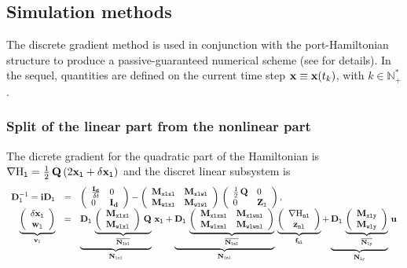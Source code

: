 \documentclass[10pt,a4paper]{article}
\begin{document}
\subsection{Simulation methods}
%
The discrete gradient method is used in conjunction with the port-Hamiltonian structure to produce a passive-guaranteed numerical scheme (see \cite{falaize2016apassive} for details).
%
In the sequel, quantities are defined on the current time step ${\mathbf{x}}\equiv{\mathbf{x}}(t_k)$, with $k\in\mathbb{N}_{+}^{*}$.
%
\subsubsection{Split of the linear part from the nonlinear part}
%
The dicrete gradient for the quadratic part of the Hamiltonian is ${\small \nabla{\mathrm{H}}_{\mathtt{l}} =\frac{1}{2}\,\mathbf{Q}\, (2{\mathbf{x}}_{\mathtt{l}} + \delta {\mathbf{x}}_{\mathtt{l}})}$ and the discret linear subsystem is
%
\begin{equation}
\begin{array}{rcl}
\mathbf{D}_{\mathtt{l}}^{-1} = \mathbf{iD}_{\mathtt{l}} &=& \left(\begin{array}{ll}
\frac{\mathbf{I_d}}{\delta t}&0 \\ 
0 &\mathbf{I_d}
\end{array}\right)-\left(\begin{array}{ll}
\mathbf{M}_{\mathtt{xlxl}}&\mathbf{M}_{\mathtt{xlwl}} \\ 
\mathbf{M}_{\mathtt{wlxl}}&\mathbf{M}_{\mathtt{wlwl}} 
\end{array}\right)\,\left(\begin{array}{ll}
\frac{1}{2}\,\mathbf{Q}&0 \\ 
0 &\mathbf{Z}_{\mathtt{l}}
\end{array}\right),\\
\underbrace{\left(\begin{array}{c}
\delta {\mathbf{x}}_{\mathtt{l}}\\
{\mathbf{w}}_{\mathtt{l}}
\end{array}\right) 
}_{\mathbf{v}_{\mathtt{l}}}
& = &
\underbrace{\mathbf{D}_{\mathtt{l}}\,
\underbrace{\left(\begin{array}{ll}
\mathbf{M}_{\mathtt{xlxl}}\\ 
\mathbf{M}_{\mathtt{wlxl}}
\end{array}\right)\,\mathbf{Q}}_{\overline{\mathbf{N}_{\mathtt{lxl}}}}}_{\mathbf{N}_{\mathtt{lxl}}}
\, 
{\mathbf{x}}_{\mathtt{l}}
+
  \underbrace{\mathbf{D}_{\mathtt{l}}\,
\underbrace{\left(\begin{array}{ll}
\mathbf{M}_{\mathtt{xlxnl}}& \mathbf{M}_{\mathtt{xlwnl}} \\ 
 \mathbf{M}_{\mathtt{wlxnl}}& \mathbf{M}_{\mathtt{wlwnl}} 
\end{array}\right)}_{\overline{\mathbf{N}_{\mathtt{lnl}}}}}_{\mathbf{N}_{\mathtt{lnl}}}
\,
\underbrace{\left(\begin{array}{c}
\nabla{\mathrm{H}}_{\mathtt{nl}}\\
{\mathbf{z}}_{\mathtt{nl}}
\end{array}\right) 
}_{\mathbf{f}_{\mathtt{nl}}}
+
  \underbrace{\mathbf{D}_{\mathtt{l}}\,
\underbrace{\left(\begin{array}{l}
 \mathbf{M}_{\mathtt{xly}}\\ 
 \mathbf{M}_{\mathtt{wly}}
\end{array}\right)}_{\overline{\mathbf{N}_{\mathtt{ly}}}}}_{\mathbf{N}_{\mathtt{ly}}}
\,
{\mathbf{u}}
\end{array}
\end{equation}
\end{document}
